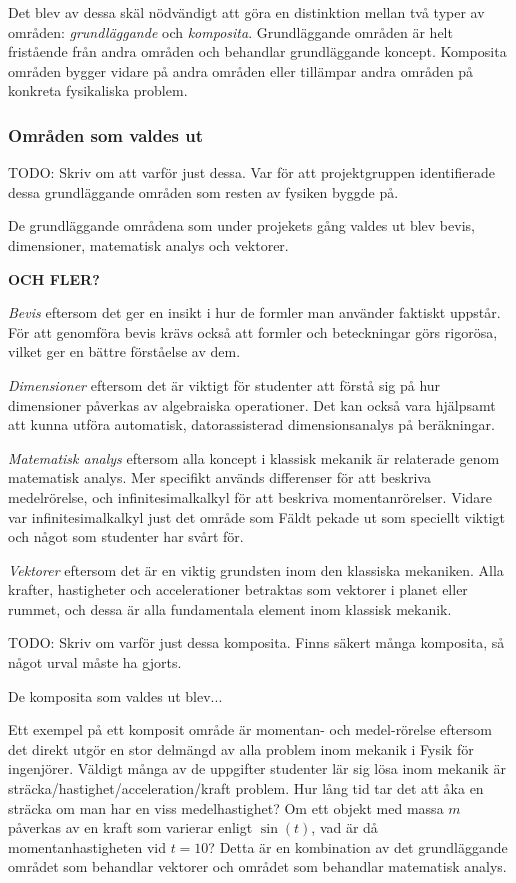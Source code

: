 \begin{draft}
Det blev av dessa skäl nödvändigt att göra en distinktion mellan två typer av områden: \textit{grundläggande} och \textit{komposita}. Grundläggande områden är helt fristående från andra områden och behandlar grundläggande koncept. Komposita områden bygger vidare på andra områden eller tillämpar andra områden på konkreta fysikaliska problem.

\subsubsection{Områden som valdes ut}

TODO: Skriv om att varför just dessa. Var för att projektgruppen identifierade dessa grundläggande områden som resten av fysiken byggde på.

De grundläggande områdena som under projekets gång valdes ut blev bevis, dimensioner, matematisk analys och vektorer. 

\textbf{OCH FLER?}

\textit{Bevis} eftersom det ger en insikt i hur de formler man använder
faktiskt uppstår. För att genomföra bevis krävs också att formler och
beteckningar görs rigorösa, vilket ger en bättre förståelse av dem.

\textit{Dimensioner} eftersom det är viktigt för studenter att förstå sig på
hur dimensioner påverkas av algebraiska operationer. Det kan också vara
hjälpsamt att kunna utföra automatisk, datorassisterad dimensionsanalys på
beräkningar.

\textit{Matematisk analys} eftersom alla koncept i klassisk mekanik är
relaterade genom matematisk analys. Mer specifikt används differenser för att
beskriva medelrörelse, och infinitesimalkalkyl för att beskriva
momentanrörelser. Vidare var infinitesimalkalkyl just det område som Fäldt
pekade ut som speciellt viktigt och något som studenter har svårt för.

\textit{Vektorer} eftersom det är en viktig grundsten inom den klassiska
mekaniken. Alla krafter, hastigheter och accelerationer betraktas som vektorer i
planet eller rummet, och dessa är alla fundamentala element inom klassisk
mekanik.

\end{draft}
\begin{binge}

TODO: Skriv om varför just dessa komposita. Finns säkert många komposita, så något urval måste ha gjorts.

De komposita som valdes ut blev...

Ett exempel på ett komposit område är momentan- och medel-rörelse eftersom det
direkt utgör en stor delmängd av alla problem inom mekanik i Fysik för
ingenjörer. Väldigt många av de uppgifter studenter lär sig lösa inom mekanik
är sträcka/hastighet/acceleration/kraft problem. Hur lång tid tar det att åka
en sträcka om man har en viss medelhastighet? Om ett objekt med massa $m$
påverkas av en kraft som varierar enligt $\sin(t)$, vad är då
momentanhastigheten vid $t=10$? Detta är en kombination av det grundläggande
området som behandlar vektorer och området som behandlar matematisk analys.

\end{binge}
